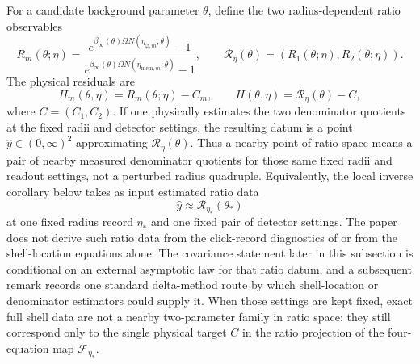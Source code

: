For a candidate background parameter $\theta$, define the two radius-dependent ratio observables
\begin{equation}\label{eq:two-mode-ratio-functions-main}
R_m(\theta;\eta)=
\frac{e^{\beta_\infty(\theta)\Omega N(\eta_{\varphi,m};\theta)}-1}
     {e^{\beta_\infty(\theta)\Omega N(\eta_{{\mathrm{mem}},m};\theta)}-1},
\qquad
\mathcal R_\eta(\theta)=(R_1(\theta;\eta),R_2(\theta;\eta)).
\end{equation}
The physical residuals are
\[
H_m(\theta,\eta)=R_m(\theta;\eta)-C_m,\qquad
H(\theta,\eta)=\mathcal R_\eta(\theta)-C,
\]
where $C=(C_1,C_2)$.
If one physically estimates the two denominator quotients at the fixed radii
and detector settings, the resulting datum is a point
$\widehat y\in(0,\infty)^2$ approximating $\mathcal R_\eta(\theta)$. Thus a
nearby point of ratio space means a pair of nearby measured denominator
quotients for those same fixed radii and readout settings, not a perturbed
radius quadruple. Equivalently, the local inverse corollary below takes as input
estimated ratio data
\[
\widehat y\approx\mathcal R_{\eta_*}(\theta_*)
\]
at one fixed radius record $\eta_*$ and one fixed pair of detector settings.
The paper does not derive such ratio data from the click-record diagnostics of
 or from the shell-location equations alone. The covariance
statement later in this subsection is conditional on an external asymptotic law
for that ratio datum, and a subsequent remark records one standard delta-method
route by which shell-location or denominator estimators could supply it.
When those settings are kept fixed, exact full shell data are not a nearby
two-parameter family in ratio space: they still correspond only to the single
physical target $C$ in the ratio projection of the four-equation map
$\mathcal F_{\eta_*}$.

